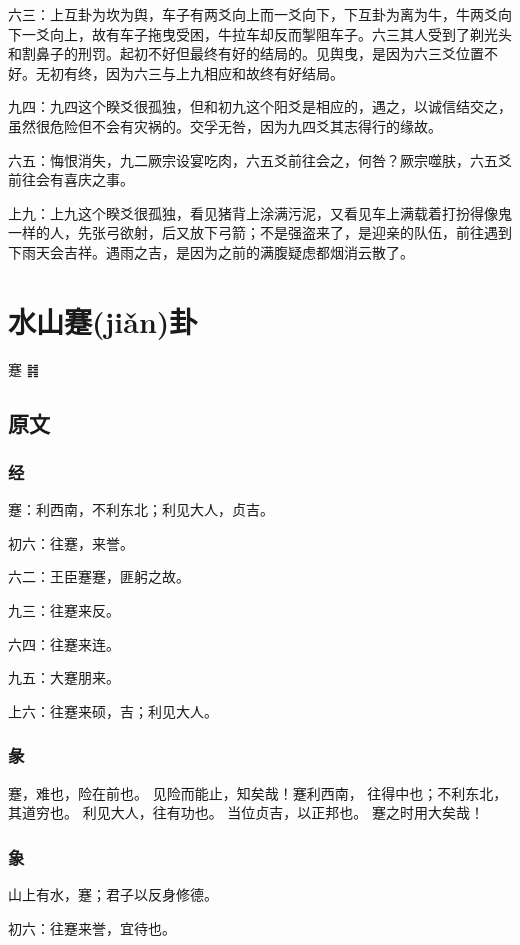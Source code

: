 \documentclass[12pt,oneside]{book}
\begin{document}
六三：上互卦为坎为舆，车子有两爻向上而一爻向下，下互卦为离为牛，牛两爻向下一爻向上，故有车子拖曳受困，牛拉车却反而掣阻车子。六三其人受到了剃光头和割鼻子的刑罚。起初不好但最终有好的结局的。见舆曳，是因为六三爻位置不好。无初有终，因为六三与上九相应和故终有好结局。

九四：九四这个睽爻很孤独，但和初九这个阳爻是相应的，遇之，以诚信结交之，虽然很危险但不会有灾祸的。交孚无咎，因为九四爻其志得行的缘故。

六五：悔恨消失，九二厥宗设宴吃肉，六五爻前往会之，何咎？厥宗噬肤，六五爻前往会有喜庆之事。

上九：上九这个睽爻很孤独，看见猪背上涂满污泥，又看见车上满载着打扮得像鬼一样的人，先张弓欲射，后又放下弓箭；不是强盗来了，是迎亲的队伍，前往遇到下雨天会吉祥。遇雨之吉，是因为之前的满腹疑虑都烟消云散了。


\chapter{水山蹇(jiǎn)卦}
蹇 {\Large ䷦}

\section{原文}

\subsection{经}
蹇：利西南，不利东北；利见大人，贞吉。

初六：往蹇，来誉。

六二：王臣蹇蹇，匪躬之故。

九三：往蹇来反。

六四：往蹇来连。

九五：大蹇朋来。

上六：往蹇来硕，吉；利见大人。

\subsection{彖}
蹇，难也，险在前也。 见险而能止，知矣哉！蹇利西南， 往得中也；不利东北，其道穷也。 利见大人，往有功也。 当位贞吉，以正邦也。 蹇之时用大矣哉！

\subsection{象}
山上有水，蹇；君子以反身修德。

初六：往蹇来誉，宜待也。
\end{document}
